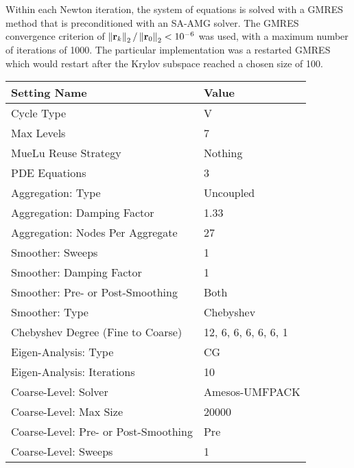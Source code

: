 Within each Newton iteration, the system of equations is solved with a GMRES method that is preconditioned with an SA-AMG solver. The GMRES convergence criterion of $\left\lVert\mathbf{r}_k\right\rVert_2/\left\lVert\mathbf{r}_0\right\rVert_2 < 10^{-6}$ was used, with a maximum number of iterations of 1000. The particular implementation was a restarted GMRES which would restart after the Krylov subspace reached a chosen size of 100.

\begin{table}[ht]
    \centering
    \begin{tabular}{|l|l|} 
    \hline
    Setting Name & Value \\
    \hline
    Cycle Type                          & V                     \\
    Max Levels                          & 7                     \\
    MueLu Reuse Strategy                & Nothing               \\
    PDE Equations                       & 3                     \\
    \hline
    Aggregation: Type                    & Uncoupled             \\
    Aggregation: Damping Factor          & 1.33                  \\
    Aggregation: Nodes Per Aggregate    & 27                    \\
    \hline
    Smoother: Sweeps                     & 1                     \\
    Smoother: Damping Factor             & 1                     \\
    Smoother: Pre- or Post-Smoothing     & Both                  \\
    Smoother: Type                       & Chebyshev             \\
    Chebyshev Degree (Fine to Coarse)       & 12, 6, 6, 6, 6, 6, 1  \\
    Eigen-Analysis: Type                 & CG                    \\
    Eigen-Analysis: Iterations           & 10                    \\
    \hline
    Coarse-Level: Solver                 & Amesos-UMFPACK        \\
    Coarse-Level: Max Size               & 20000                 \\
    Coarse-Level: Pre- or Post-Smoothing & Pre                   \\
    Coarse-Level: Sweeps                 & 1                     \\

\end{tabular}
\end{table}

